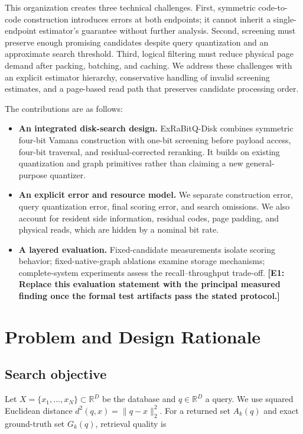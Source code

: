 This organization creates three technical challenges. First, symmetric code-to-code construction introduces errors at both endpoints; it cannot inherit a single-endpoint estimator's guarantee without further analysis. Second, screening must preserve enough promising candidates despite query quantization and an approximate search threshold. Third, logical filtering must reduce physical page demand after packing, batching, and caching. We address these challenges with an explicit estimator hierarchy, conservative handling of invalid screening estimates, and a page-based read path that preserves candidate processing order.

The contributions are as follows:

\begin{itemize}
\item \textbf{An integrated disk-search design.} ExRaBitQ-Disk combines symmetric four-bit Vamana construction with one-bit screening before payload access, four-bit traversal, and residual-corrected reranking. It builds on existing quantization and graph primitives rather than claiming a new general-purpose quantizer.
\item \textbf{An explicit error and resource model.} We separate construction error, query quantization error, final scoring error, and search omissions. We also account for resident side information, residual codes, page padding, and physical reads, which are hidden by a nominal bit rate.
\item \textbf{A layered evaluation.} Fixed-candidate measurements isolate scoring behavior; fixed-native-graph ablations examine storage mechanisms; complete-system experiments assess the recall--throughput trade-off. \textbf{[E1: Replace this evaluation statement with the principal measured finding once the formal test artifacts pass the stated protocol.]}
\end{itemize}

\section{Problem and Design Rationale}

\subsection{Search objective}

Let $X=\{x_1,\ldots,x_N\}\subset\mathbb{R}^D$ be the database and $q\in\mathbb{R}^D$ a query. We use squared Euclidean distance $d^2(q,x)=\|q-x\|_2^2$. For a returned set $A_k(q)$ and exact ground-truth set $G_k(q)$, retrieval quality is

